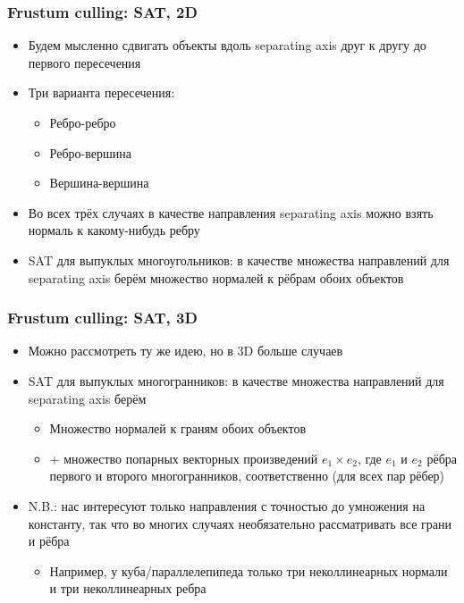 \documentclass{beamer}
\begin{document}
\begin{frame}[fragile]
\frametitle{Frustum culling: SAT, 2D}
\begin{itemize}
\item Будем мысленно сдвигать объекты вдоль separating axis друг к другу до первого пересечения
\pause
\item Три варианта пересечения:
\begin{itemize}
\item Ребро-ребро
\item Ребро-вершина
\item Вершина-вершина
\end{itemize}
\pause
\item Во всех трёх случаях в качестве направления separating axis можно взять нормаль к какому-нибудь ребру
\pause
\item SAT для выпуклых многоугольников: в качестве множества направлений для separating axis берём множество нормалей к рёбрам обоих объектов
\end{itemize}
\end{frame}

\begin{frame}[fragile]
\frametitle{Frustum culling: SAT, 3D}
\begin{itemize}
\item Можно рассмотреть ту же идею, но в 3D больше случаев
\pause
\item SAT для выпуклых многогранников: в качестве множества направлений для separating axis берём
\begin{itemize}
\item Множество нормалей к граням обоих объектов
\item + множество попарных векторных произведений \begin{math}e_1 \times e_2\end{math}, где \begin{math}e_1\end{math} и \begin{math}e_2\end{math} \textendash{} рёбра первого и второго многогранников, соответственно (для всех пар рёбер)
\end{itemize}
\pause
\item N.B.: нас интересуют только направления с точностью до умножения на константу, так что во многих случаях необязательно рассматривать все грани и рёбра
\pause
\begin{itemize}
\item Например, у куба/параллелепипеда только три неколлинеарных нормали и три неколлинеарных ребра
\end{itemize}
\end{itemize}
\end{frame}
\end{document}
